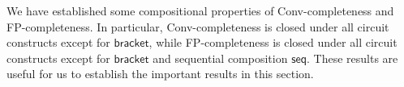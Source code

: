 We have established some compositional properties of Conv-completeness and FP-completeness. In particular, Conv-completeness is closed under all circuit constructs except for $\mathsf{bracket}$, while FP-completeness is closed under all circuit constructs except for $\mathsf{bracket}$ and sequential composition $\mathsf{seq}$. These results are useful for us to establish the important results in this section.








